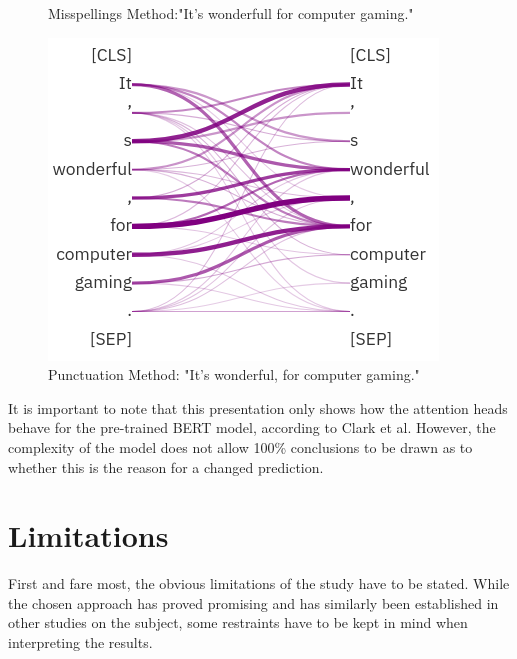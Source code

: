 \begin{figure}[!htb]
  \caption[BERTbase attention heads - Misspellings]{Misspellings Method:"It's wonderfull for computer gaming."}\label{fig:attention_typo}
\endminipage\hfill
{}%
  \includegraphics[width=\linewidth]{img/attention_punct.png}
  \caption[BERTbase attention heads - Punctuation]{Punctuation Method: "It's wonderful, for computer gaming."}\label{fig:attention_punct}
\endminipage
\end{figure}

It is important to note that this presentation only shows how the attention heads behave for the pre-trained BERT model, according to Clark et al. However, the complexity of the model does not allow 100\% conclusions to be drawn as to whether this is the reason for a changed prediction. 

\section{Limitations}
First and fare most, the obvious limitations of the study have to be stated. While the chosen approach has proved promising and has similarly been established in other studies on the subject, some restraints have to be kept in mind when interpreting the results. 

